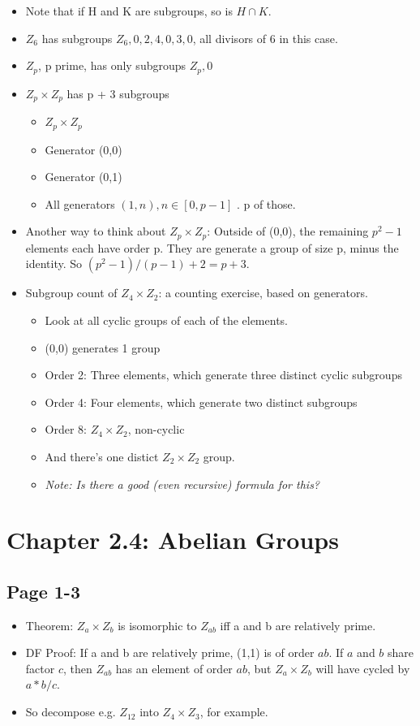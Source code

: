 \documentclass[11pt, oneside]{article}   	%
\begin{document}
\begin {itemize} 
\item Note that if H and K are subgroups, so is $H \cap K$.
\item $Z_6$ has subgroups $Z_6, {0, 2, 4}, {0, 3}, {0}$, all divisors of 6 in this case.
\item $Z_p$, p prime, has only subgroups $Z_p, {0}$
\item $Z_p \times Z_p$ has p + 3 subgroups 
  \begin{itemize}
  \item $Z_p \times Z_p$
  \item Generator (0,0)
  \item Generator (0,1)
  \item All generators $(1, n), n \in [0, p-1]$ . p of those.
  \end {itemize} 
\item Another way to think about  $Z_p \times Z_p$: Outside of (0,0), the remaining $p^2-1$ elements each have order p.  They are generate a group of size p, minus the identity.  So $(p^2-1)/(p-1) + 2 = p+3.$
\item Subgroup count of $Z_4 \times Z_2$: a counting exercise, based on generators. 
\begin{itemize}
\item Look at all cyclic groups of each of the elements.
\item (0,0) generates 1 group
\item Order 2: Three elements, which generate three distinct cyclic subgroups
\item Order 4: Four elements, which generate two distinct subgroups
\item Order 8: $Z_4 \times Z_2$, non-cyclic
\item And there's one distict $Z_2 \times Z_2$ group.
\item \emph{Note: Is there a good (even recursive) formula for this?}
\end {itemize} 

\end {itemize} 

\section {Chapter 2.4: Abelian Groups}


\subsection{Page 1-3}
\begin{itemize}
\item Theorem: $Z_a \times Z_b$ is isomorphic to $Z_{ab}$ iff a and b are relatively prime.
\item DF Proof: If a and b are relatively prime, (1,1) is of order $ab$.  If $a$ and $b$ share factor $c$, then $Z_{ab}$ has an element of order $ab$, but $Z_a \times Z_b$ will have cycled by $a * b / c$.
\item So decompose e.g. $Z_{12}$ into $Z_4 \times Z_3$, for example.
\end{itemize}
\end{document}
